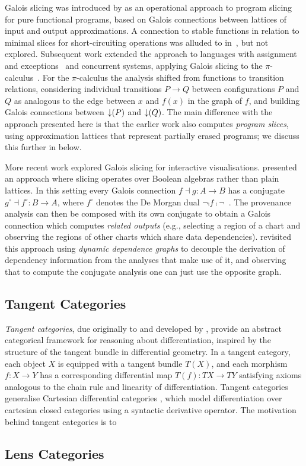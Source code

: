 Galois slicing was introduced by \citet{perera12a} as an operational approach to program slicing for pure
functional programs, based on Galois connections between lattices of input and output approximations. A
connection to stable functions in relation to minimal slices for short-circuiting operations was alluded to
in~\citet{perera13}, but not explored. Subsequent work extended the approach to languages with assignment and
exceptions~\cite{ricciotti17} and concurrent systems, applying Galois slicing to the
$\pi$-calculus~\cite{perera16d}. For the $\pi$-calculus the analysis shifted from functions to transition
relations, considering individual transitions $P \longrightarrow Q$ between configurations $P$ and $Q$ as
analogous to the edge between $x$ and $f(x)$ in the graph of $f$, and building Galois connections between
$\mathop{\downarrow}(P)$ and $\mathop{\downarrow}(Q)$. The main difference with the approach presented here is that the earlier work
also computes \emph{program slices}, using approximation lattices that represent partially erased programs; we
discuss this further in  below.

More recent work explored Galois slicing for interactive visualisations. \citet{perera22} presented an
approach where slicing operates over Boolean algebras rather than plain lattices. In this setting every Galois
connection $f \dashv g: A \to B$ has a conjugate $g^\circ \dashv f^\circ: B \to A$, where $f^\circ$ denotes
the De Morgan dual $\neg \comp f \comp \neg$~\cite{jonsson51}. The provenance analysis can then be composed
with its own conjugate to obtain a Galois connection which computes \emph{related outputs} (e.g., selecting a
region of a chart and observing the regions of other charts which share data dependencies). \citet{bond25}
revisited this approach using \emph{dynamic dependence graphs} to decouple the derivation of dependency
information from the analyses that make use of it, and observing that to compute the conjugate analysis one
can just use the opposite graph.

\subsection{Tangent Categories}

\emph{Tangent categories}, due originally to \citet{rosický84} and developed by \citet{cockett14,cockett18},
provide an abstract categorical framework for reasoning about differentiation, inspired by the structure of
the tangent bundle in differential geometry. In a tangent category, each object $X$ is equipped with a tangent
bundle $T(X)$, and each morphism $f: X \to Y$ has a corresponding differential map $T(f): TX \to TY$
satisfying axioms analogous to the chain rule and linearity of differentiation. Tangent categories generalise
Cartesian differential categories \cite{cdcs}, which model differentiation over cartesian closed categories
using a syntactic derivative operator. The motivation behind tangent categories is to 

\subsection{Lens Categories}

\cite{spivak19}
